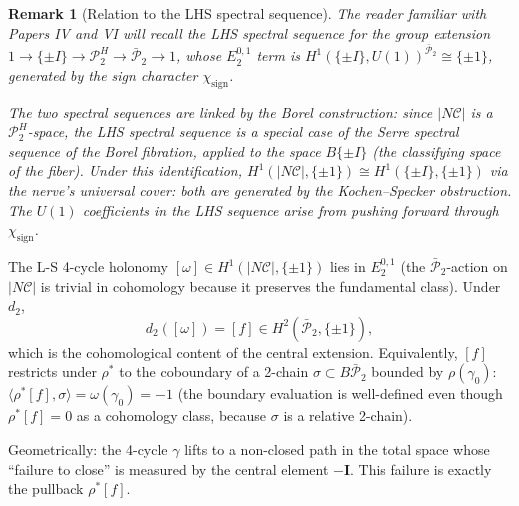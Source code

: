 \documentclass[11pt]{article}
\newtheorem{remark}[theorem]{Remark}
\begin{document}
\begin{remark}[Relation to the LHS spectral sequence]
\label{rem:spectral-sequence-link}
The reader familiar with Papers IV and VI will recall the LHS spectral sequence
for the group extension $1 \to \{\pm I\} \to \mathcal{P}_2^H \to \bar{\mathcal{P}}_2 \to 1$,
whose $E_2^{0,1}$ term is $H^1(\{\pm I\}, U(1))^{\bar{\mathcal{P}}_2} \cong \{\pm 1\}$,
generated by the sign character $\chi_{\text{sign}}$.

The two spectral sequences are linked by the Borel construction: since
$|N\mathcal{C}|$ is a $\mathcal{P}_2^H$-space, the LHS spectral sequence is
a special case of the Serre spectral sequence of the Borel fibration,
applied to the space $B\{\pm I\}$ (the classifying space of the fiber).
Under this identification, $H^1(|N\mathcal{C}|, \{\pm 1\}) \cong
H^1(\{\pm I\}, \{\pm 1\})$ via the nerve's universal cover: both are
generated by the Kochen--Specker obstruction. The $U(1)$ coefficients
in the LHS sequence arise from pushing forward through $\chi_{\text{sign}}$.
\end{remark}

The L-S 4-cycle holonomy $[\omega] \in H^1(|N\mathcal{C}|, \{\pm 1\})$ lies in
$E_2^{0,1}$ (the $\bar{\mathcal{P}}_2$-action on $|N\mathcal{C}|$ is trivial in
cohomology because it preserves the fundamental class). Under $d_2$,
\[
d_2([\omega]) = [f] \in H^2(\bar{\mathcal{P}}_2, \{\pm 1\}),
\]
which is the cohomological content of the central extension.
Equivalently, $[f]$ restricts under $\rho^*$ to the coboundary of a
2-chain $\sigma \subset B\bar{\mathcal{P}}_2$ bounded by $\rho(\gamma_0)$:
$\langle \rho^*[f], \sigma \rangle = \omega(\gamma_0) = -1$ (the boundary
evaluation is well-defined even though $\rho^*[f] = 0$ as a cohomology class,
because $\sigma$ is a relative 2-chain).

Geometrically: the 4-cycle $\gamma$ lifts to a non-closed path in the total space
whose ``failure to close'' is measured by the central element $-\mathbf{I}$.
This failure is exactly the pullback $\rho^*[f]$.
\end{document}
